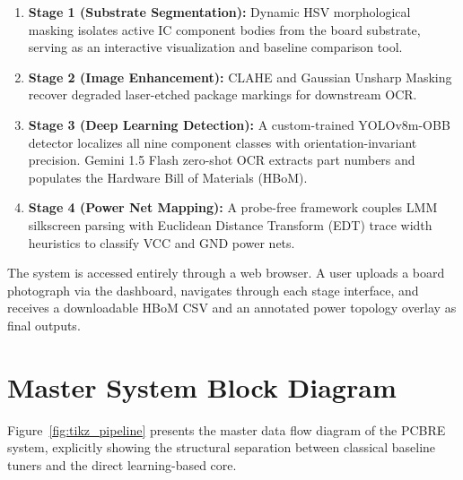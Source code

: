 \documentclass[12pt,a4paper]{report}
\begin{document}
\begin{enumerate}
  \item \textbf{Stage 1 (Substrate Segmentation):} Dynamic HSV morphological masking isolates active IC component bodies from the board substrate, serving as an interactive visualization and baseline comparison tool.
  \item \textbf{Stage 2 (Image Enhancement):} CLAHE and Gaussian Unsharp Masking recover degraded laser-etched package markings for downstream OCR.
  \item \textbf{Stage 3 (Deep Learning Detection):} A custom-trained YOLOv8m-OBB detector localizes all nine component classes with orientation-invariant precision. Gemini 1.5 Flash zero-shot OCR extracts part numbers and populates the Hardware Bill of Materials (HBoM).
  \item \textbf{Stage 4 (Power Net Mapping):} A probe-free framework couples LMM silkscreen parsing with Euclidean Distance Transform (EDT) trace width heuristics to classify VCC and GND power nets.
\end{enumerate}

The system is accessed entirely through a web browser. A user uploads a board photograph via the dashboard, navigates through each stage interface, and receives a downloadable HBoM CSV and an annotated power topology overlay as final outputs.

\section{Master System Block Diagram}
\label{sec:block_diagram}

Figure~\ref{fig:tikz_pipeline} presents the master data flow diagram of the PCBRE system, explicitly showing the structural separation between classical baseline tuners and the direct learning-based core.
\end{document}
